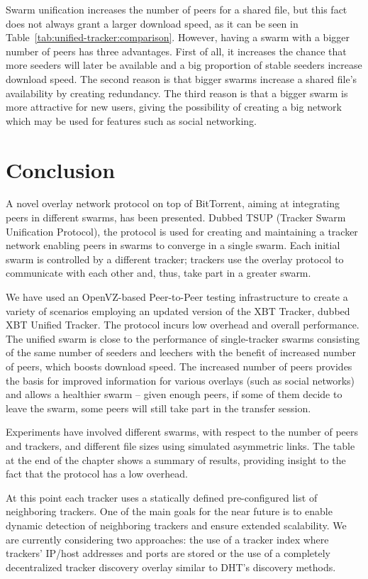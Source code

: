 Swarm unification increases the number of peers for a shared file, but this
fact does not always grant a larger download speed, as it can be seen in
Table~\ref{tab:unified-tracker:comparison}. However, having a swarm with a
bigger number of peers has three advantages. First of all, it increases the chance
that more seeders will later be available and a big proportion of stable
seeders increase download speed. The second reason is that bigger swarms
increase a shared file's availability by creating redundancy. The third reason
is
that a bigger swarm is more attractive for new users, giving the possibility
of creating a big network which may be used for features such as social
networking.

\section{Conclusion}
\label{sec:unified-tracker:conclusion}

A novel overlay network protocol on top of BitTorrent, aiming at integrating
peers in different swarms, has been presented. Dubbed TSUP (Tracker Swarm
Unification Protocol), the protocol is used for creating and maintaining a
tracker network enabling peers in swarms to converge in a single swarm. Each
initial swarm is controlled by a different tracker; trackers use the overlay
protocol to communicate with each other and, thus, take part in a greater
swarm.

We have used an OpenVZ-based Peer-to-Peer testing infrastructure to create a
variety of scenarios employing an updated version of the XBT Tracker, dubbed
XBT Unified Tracker. The protocol incurs low overhead and overall performance.
The unified swarm is close to the performance of single-tracker swarms
consisting of the same number of seeders and leechers with the benefit of
increased number of peers, which boosts download speed. The increased number of peers provides the basis
for improved information for various overlays (such as social networks) and
allows a healthier swarm -- given enough peers, if some of them decide to
leave the swarm, some peers will still take part in the transfer session.

Experiments have involved different swarms, with respect to the number of
peers and trackers, and different file sizes using simulated asymmetric links.
The table at the end of the chapter shows a summary of results, providing
insight to the fact that the protocol has a low overhead.

At this point each tracker uses a statically defined pre-configured list of
neighboring trackers. One of the main goals for the near future is to enable
dynamic detection of neighboring trackers and ensure extended scalability. We
are currently considering two approaches: the use of a tracker index where
trackers' IP/host addresses and ports are stored or the use of a completely
decentralized tracker discovery overlay similar to DHT's discovery methods.

